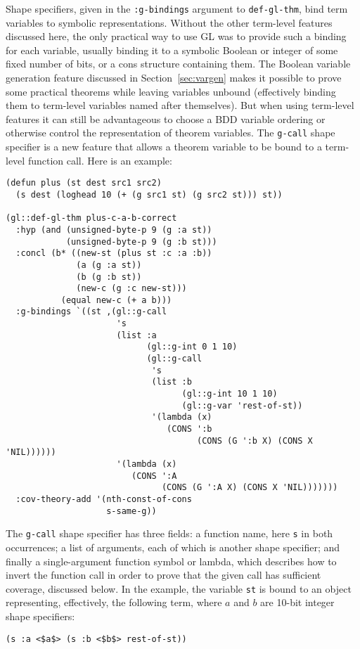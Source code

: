 \documentclass[submission,copyright,creativecommons]{eptcs}
\begin{document}
Shape specifiers, given in the \texttt{:g-bindings} argument to
\texttt{def-gl-thm}, bind term variables to symbolic representations.
Without the other term-level features discussed here, the only
practical way to use GL was to provide such a binding for each
variable, usually binding it to a symbolic Boolean or integer of some
fixed number of bits, or a cons structure containing them.  The
Boolean variable generation feature discussed in
Section~\ref{sec:vargen} makes it possible to prove some practical
theorems while leaving variables unbound (effectively binding them to
term-level variables named after themselves). But when using
term-level features it can still be advantageous to choose a BDD
variable ordering or otherwise control the representation of theorem
variables.  The \texttt{g-call} shape specifier is a new feature that
allows a theorem variable to be bound to a term-level function call.
Here is an example:
\begin{verbatim}
(defun plus (st dest src1 src2)
  (s dest (loghead 10 (+ (g src1 st) (g src2 st))) st))

(gl::def-gl-thm plus-c-a-b-correct
  :hyp (and (unsigned-byte-p 9 (g :a st))
            (unsigned-byte-p 9 (g :b st)))
  :concl (b* ((new-st (plus st :c :a :b))
              (a (g :a st))
              (b (g :b st))
              (new-c (g :c new-st)))
           (equal new-c (+ a b)))
  :g-bindings `((st ,(gl::g-call
                      's
                      (list :a
                            (gl::g-int 0 1 10)
                            (gl::g-call
                             's
                             (list :b
                                   (gl::g-int 10 1 10)
                                   (gl::g-var 'rest-of-st))
                             '(lambda (x)
                                (CONS ':b
                                      (CONS (G ':b X) (CONS X 'NIL))))))
                      '(lambda (x)
                         (CONS ':A
                               (CONS (G ':A X) (CONS X 'NIL)))))))
  :cov-theory-add '(nth-const-of-cons
                    s-same-g))
\end{verbatim}
The \texttt{g-call} shape specifier has three fields: a function name,
here \texttt{s} in both occurrences; a list of arguments, each of
which is another shape specifier; and finally a single-argument
function symbol or lambda, which describes how to invert the function
call in order to prove that the given call has sufficient coverage,
discussed below.  In the example, the variable \texttt{st} is bound to
an object representing, effectively, the following term, where $a$ and
$b$ are 10-bit integer shape specifiers:
\begin{lstlisting}
(s :a <$a$> (s :b <$b$> rest-of-st))
\end{lstlisting}
\end{document}
